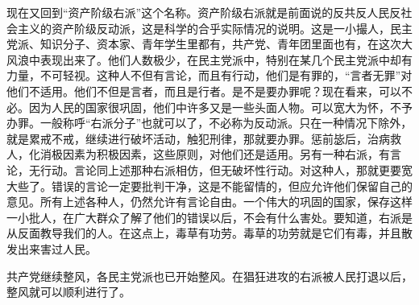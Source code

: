 现在又回到“资产阶级右派”这个名称。资产阶级右派就是前面说的反共反人民反社会主义的资产阶级反动派，这是科学的合乎实际情况的说明。这是一小撮人，民主党派、知识分子、资本家、青年学生里都有，共产党、青年团里面也有，在这次大风浪中表现出来了。他们人数极少，在民主党派中，特别在某几个民主党派中却有力量，不可轻视。这种人不但有言论，而且有行动，他们是有罪的，“言者无罪”对他们不适用。他们不但是言者，而且是行者。是不是要办罪呢？现在看来，可以不必。因为人民的国家很巩固，他们中许多又是一些头面人物。可以宽大为怀，不予办罪。一般称呼“右派分子”也就可以了，不必称为反动派。只在一种情况下除外，就是累戒不戒，继续进行破坏活动，触犯刑律，那就要办罪。惩前毖后，治病救人，化消极因素为积极因素，这些原则，对他们还是适用。另有一种右派，有言论，无行动。言论同上述那种右派相仿，但无破坏性行动。对这种人，那就更要宽大些了。错误的言论一定要批判干净，这是不能留情的，但应允许他们保留自己的意见。所有上述各种人，仍然允许有言论自由。一个伟大的巩固的国家，保存这样一小批人，在广大群众了解了他们的错误以后，不会有什么害处。要知道，右派是从反面教导我们的人。在这点上，毒草有功劳。毒草的功劳就是它们有毒，并且散发出来害过人民。

共产党继续整风，各民主党派也已开始整风。在猖狂进攻的右派被人民打退以后，整风就可以顺利进行了。
